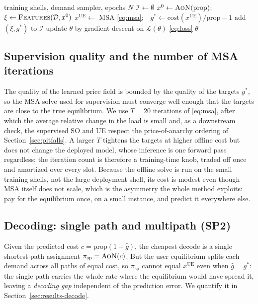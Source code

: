 \documentclass[journal]{IEEEtran}
\newcommand{\cost}{\mathrm{cost}}
\newcommand{\prop}{\mathrm{prop}}
\newcommand{\AoN}{\textsc{AoN}}
\begin{document}
\begin{algorithm}[t]
\caption{Offline supervision}
\label{alg:train}
\begin{algorithmic}[1]
\Require training shells, demand sampler, epochs $N$
\State $\mathcal{I}\gets\emptyset$
  \State $x^{0}\gets\AoN(\prop)$;\ \ $\xi\gets\textsc{Features}(\mathcal{D},x^{0})$
  \State $x^{\mathrm{UE}}\gets$ MSA \eqref{eq:msa};\ \ $g^{*}\gets \cost(x^{\mathrm{UE}})/\prop-1$
  \State add $(\xi,g^{*})$ to $\mathcal{I}$
\EndFor
{}
  \State update $\theta$ by gradient descent on $\mathcal{L}(\theta)$ \eqref{eq:loss}
\EndFor
\State \Return $\theta$
\end{algorithmic}
\end{algorithm}

\subsection{Supervision quality and the number of MSA iterations}
The quality of the learned price field is bounded by the quality of the targets $g^{*}$, so
the MSA solve used for supervision must converge well enough that the targets are close to the
true equilibrium. We use $T{=}20$ iterations of \eqref{eq:msa}, after which the average
relative change in the load is small and, as a downstream check, the supervised SO and UE
respect the price-of-anarchy ordering of Section~\ref{sec:pitfalls}. A larger $T$ tightens the
targets at higher offline cost but does not change the deployed model, whose inference is one
forward pass regardless; the iteration count is therefore a training-time knob, traded off once
and amortized over every slot. Because the offline solve is run on the small training shells,
not the large deployment shell, its cost is modest even though MSA itself does not scale, which
is the asymmetry the whole method exploits: pay for the equilibrium once, on a small instance,
and predict it everywhere else.

\subsection{Decoding: single path and multipath (SP2)}\label{sec:decode}
Given the predicted cost $c=\prop(1{+}\hat g)$, the cheapest decode is a single
shortest-path assignment $\pi_{\mathrm{sp}}=\AoN(c)$. But the user equilibrium splits
each demand across all paths of equal cost, so $\pi_{\mathrm{sp}}$ cannot equal
$x^{\mathrm{UE}}$ even when $\hat g=g^{*}$: the single path carries the whole rate where
the equilibrium would have spread it, leaving a \emph{decoding gap} independent of the
prediction error. We quantify it in Section~\ref{sec:results-decode}.
\end{document}
